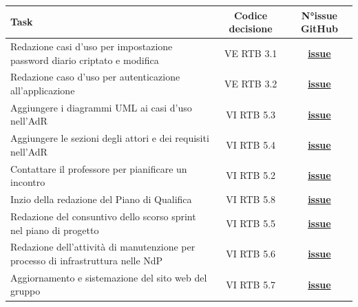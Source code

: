 \documentclass[a4paper,12pt]{article}
\begin{document}
\begin{center}
\small
\renewcommand{\arraystretch}{1.2} 
\begin{tabular}{|p{}|c|c|}
\hline
\rowcolor{gray!60} 
\textbf{Task} & \textbf{Codice decisione} & \textbf{N°issue GitHub} \\
\hline
\rowcolor{white}
Redazione casi d'uso per impostazione password diario criptato e modifica & VE RTB 3.1 & \href{https://github.com/SWE-BitByBit/SWE-docs/issues/216}{\textbf{issue}} \\
\hline
\rowcolor{gray!20}
Redazione caso d'uso per autenticazione all'applicazione & VE RTB 3.2 & \href{https://github.com/SWE-BitByBit/SWE-docs/issues/213}{\textbf{issue}} \\
\hline
\rowcolor{white}
Aggiungere i diagrammi UML ai casi d'uso nell'AdR & VI RTB 5.3 & \href{https://github.com/SWE-BitByBit/SWE-docs/issues/204}{\textbf{issue}} \\
\hline
\rowcolor{gray!20}
Aggiungere le sezioni degli attori e dei requisiti nell'AdR & VI RTB 5.4 & \href{https://github.com/SWE-BitByBit/SWE-docs/issues/206}{\textbf{issue}} \\
\hline
\rowcolor{white}
Contattare il professore per pianificare un incontro & VI RTB 5.2 & \href{https://github.com/SWE-BitByBit/SWE-docs/issues/208}{\textbf{issue}} \\
\hline
\rowcolor{gray!20}
Inzio della redazione del Piano di Qualifica & VI RTB 5.8 & \href{https://github.com/SWE-BitByBit/SWE-docs/issues/210}{\textbf{issue}} \\
\hline
\rowcolor{white}
Redazione del consuntivo dello scorso sprint nel piano di progetto & VI RTB 5.5 & \href{https://github.com/SWE-BitByBit/SWE-docs/issues/207}{\textbf{issue}} \\
\hline
\rowcolor{gray!20}
Redazione dell'attività di manutenzione per processo di infrastruttura nelle NdP & VI RTB 5.6 & \href{https://github.com/SWE-BitByBit/SWE-docs/issues/211}{\textbf{issue}} \\
\hline
\rowcolor{white}
Aggiornamento e sistemazione del sito web del gruppo & VI RTB 5.7 & \href{https://github.com/SWE-BitByBit/SWE-docs/issues/212}{\textbf{issue}} \\
\hline

\end{tabular}
\end{center}
\end{document}
